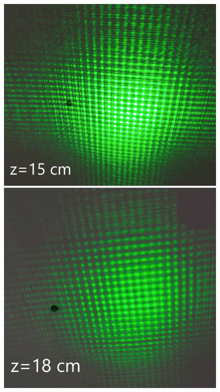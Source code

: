 \documentclass[a4paper,12pt]{article} %
\begin{document}
\begin{figure}[h]
\begin{center}
\begin{minipage}[h]{0.4\linewidth}
\includegraphics[width=1\linewidth]{43}
\caption{} %
\label{ris:experimoriginal} %
\end{minipage}
\hfill 
\begin{minipage}[h]{0.4\linewidth}
\includegraphics[width=1\linewidth]{44}
\caption{}
\label{ris:experimcoded}
\end{minipage}
\end{center}
\end{figure}
\end{document}
